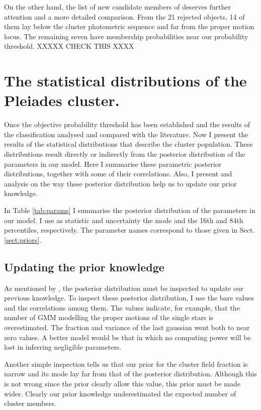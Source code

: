 On the other hand, the list of new candidate members of \citet{Stauffer2007} deserves further attention and a more detailed comparison.
From the 21 rejected objects, 14 of them lay below the cluster photometric sequence and  far from the proper motion locus. The remaining seven have membership probabilities near our probability threshold. XXXXX CHECK THIS XXXX 
 
\section{The statistical distributions of the Pleiades cluster.}
Once the objective probability threshold has been established and the results of the classification analysed and compared with the literature. Now I present the results of the statistical distributions that describe the cluster population. These distributions result directly or indirectly from the posterior distribution of the parameters in our model. Here I summarise these parametric posterior distributions, together with some of their correlations. Also, I present and analysis on the way these posterior distribution help us to update our prior knowledge.

In Table \ref{tab:params} I summarise the posterior distribution of the parameters in our model. I use as statistic and uncertainty the mode and the 16th and 84th percentiles, respectively. The parameter names correspond to those given in Sect. \ref{sect:priors}. 


%

\subsection{Updating the prior knowledge}
As mentioned by \citet{Gelman2006}, the posterior distribution must be inspected to update our previous knowledge. To inspect these posterior distribution, I use the bare values and the correlations among them. The values indicate, for example, that the number of  GMM modelling the proper motions of the single stars is overestimated. The fraction and variance of the last gaussian went both to near zero values. A better model would be that in which no computing power will be lost in inferring negligible parameters.

Another simple inspection tells us that our prior for the cluster field fraction is narrow and its mode lay far from that of the posterior distribution. Although this is not wrong since the prior clearly allow this value, this prior must be made wider.  Clearly our prior knowledge underestimated the expected number of cluster members.   

